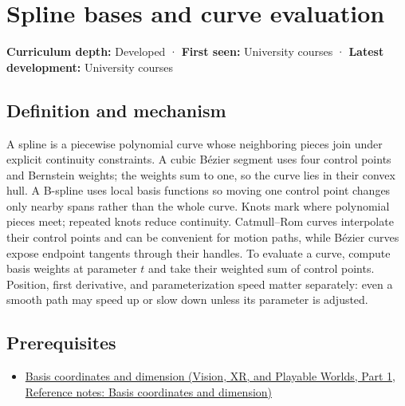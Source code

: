 \hypertarget{appendix-f28eeec97a3d}{}\label{referencestart:appendix-f28eeec97a3d}
\section{Spline bases and curve evaluation}\label{appendix-f28eeec97a3d-spline-bases-and-curve-evaluation}

\hypertarget{appendix-f28eeec97a3d-spline-bases-and-curve-evaluation}{}

\textbf{Curriculum depth:} Developed · \textbf{First seen:} University courses · \textbf{Latest development:} University courses

\begin{allmightroledefinition}

\subsection{Definition and mechanism}\label{appendix-f28eeec97a3d-definition-and-mechanism}

\hypertarget{appendix-f28eeec97a3d-definition-and-mechanism}{}

A spline is a piecewise polynomial curve whose neighboring pieces join under explicit continuity constraints. A cubic Bézier segment uses four control points and Bernstein weights; the weights sum to one, so the curve lies in their convex hull. A B-spline uses local basis functions so moving one control point changes only nearby spans rather than the whole curve. Knots mark where polynomial pieces meet; repeated knots reduce continuity. Catmull--Rom curves interpolate their control points and can be convenient for motion paths, while Bézier curves expose endpoint tangents through their handles. To evaluate a curve, compute basis weights at parameter \(t\) and take their weighted sum of control points. Position, first derivative, and parameterization speed matter separately: even a smooth path may speed up or slow down unless its parameter is adjusted.

\end{allmightroledefinition}

\subsection{Prerequisites}\label{appendix-f28eeec97a3d-prerequisites}

\hypertarget{appendix-f28eeec97a3d-prerequisites}{}

\begin{itemize}
\tightlist
\item
  \href{../07-Vision-XR-and-Playable-Worlds-P01/main.pdf\#nameddest=appendix-ce0341f7ea0d}{Basis coordinates and dimension (Vision, XR, and Playable Worlds, Part 1, Reference notes: Basis coordinates and dimension)}
\end{itemize}

